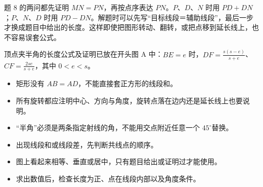 
题 \(8\) 的两问都先证明 \(MN=PN\)，再按点序表达 \(PN\)。\(P\)、\(D\)、\(N\) 时用 \(PD+DN\)；\(P\)、\(N\)、\(D\) 时用 \(PD-DN\)。解题时可以先写“目标线段＝辅助线段”，最后一步才换成题目中给出的长度。这样即使把图形转动、翻转，或把点移到延长线上，也不容易误套公式。

顶点夹半角的长度公式及证明已放在开头图 A 中：\(BE=e\) 时，\(DF=\frac{s(s-e)}{s+e}\)、\(CF=\frac{2se}{s+e}\)，其中 \(0<e<s\)。


\begin{itemize}
\item 矩形没有 \(AB=AD\)，不能直接套正方形的线段和。
\item 所有旋转都应注明中心、方向与角度，旋转点落在边内还是延长线上也要说明。
\item “半角”必须是两条指定射线的角，不能用交点附近任意一个 \(45^\circ \)替换。
\item 出现线段和或线段差，先判断共线点的顺序。
\item 图上看起来相等、垂直或居中，只有题目给出或证明过才能使用。
\item 求出数值后，检查长度为正、点在线段内部以及角度条件。
\end{itemize}
\else
{}\workspace[10]
\fi
